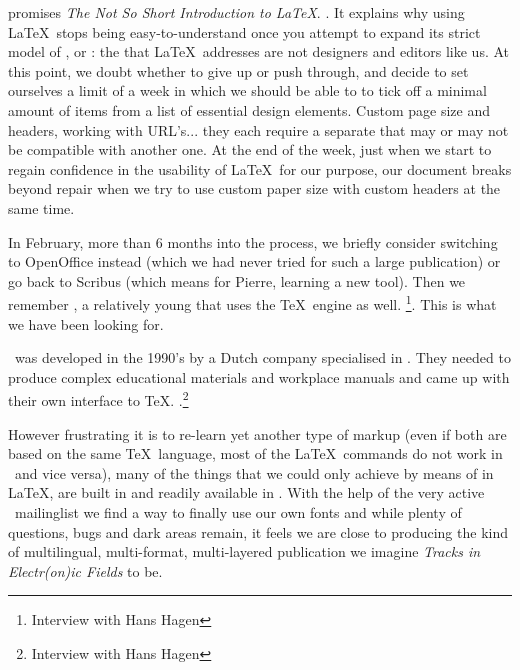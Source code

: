  promises {\em The Not So Short
Introduction to \LaTeX}. . It
explains why using \LaTeX\ stops being easy-to-understand once you
attempt to expand its strict model of
,
 or
: the
 that \LaTeX\ addresses are not designers
and editors like us. At this point, we doubt whether to give up or push
through, and decide to set ourselves a limit of a week in which we
should be able to to tick off a minimal amount of items from a list of
essential design elements. Custom page size and headers, working with
URL's... they each require a separate
 that may or may not be
compatible with another one. At the end of the week, just when we start
to regain confidence in the usability of \LaTeX\ for our purpose, our
document breaks beyond repair when we try to use custom paper size
with custom headers at the same time.

In February, more than 6 months into the process, we briefly consider
switching to OpenOffice instead (which we had never tried for such a
large publication) or go back to Scribus (which means for Pierre,
learning a new tool). Then we remember \ConTeXt, a relatively young
 that uses the \TeX\ engine
as well. \footnote{Interview with Hans Hagen
}. This is
what we have been looking for.

\ConTeXt\ was developed in the 1990's by a Dutch company
specialised in . They needed to produce complex
educational materials and workplace manuals and came up with their own
interface to \TeX. .\footnote{Interview with Hans Hagen
}

However frustrating it is to re-learn yet another type of markup (even
if both are based on the same \TeX\ language, most of the \LaTeX\ commands
do not work in \ConTeXt\ and vice versa), many of the things that we
could only achieve by means of  in
\LaTeX, are built in and readily available in \ConTeXt. With the help of
the very active \ConTeXt\ mailinglist we find a way to finally use our
own fonts and while plenty of questions, bugs and dark areas remain, it
feels we are close to producing the kind of multilingual, multi-format,
multi-layered publication we imagine {\em Tracks in Electr(on)ic
Fields} to be.

